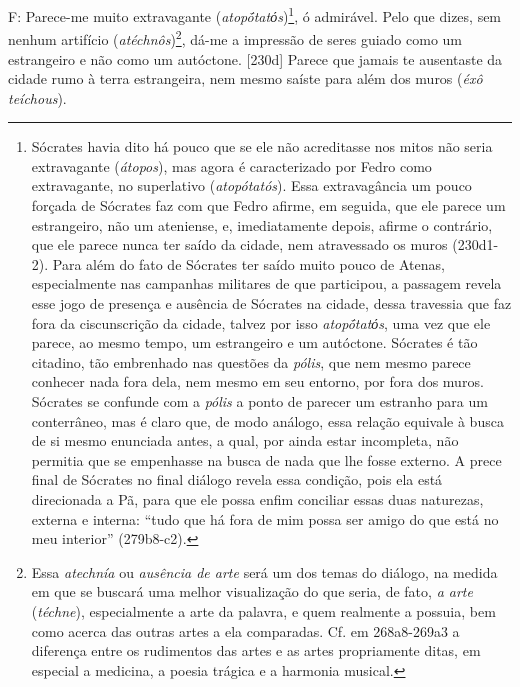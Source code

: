 F: Parece-me muito extravagante (\emph{atopṓtatόs})\footnote{Sócrates
  havia dito há pouco que se ele não acreditasse nos mitos não seria
  extravagante (\emph{átopos}), mas agora é caracterizado por Fedro como
  extravagante, no superlativo (\emph{atopótatós}). Essa extravagância
  um pouco forçada de Sócrates faz com que Fedro afirme, em seguida, que
  ele parece um estrangeiro, não um ateniense, e, imediatamente depois,
  afirme o contrário, que ele parece nunca ter saído da cidade, nem
  atravessado os muros (230d1-2). Para além do fato de Sócrates ter
  saído muito pouco de Atenas, especialmente nas campanhas militares de
  que participou, a passagem revela esse jogo de presença e ausência de
  Sócrates na cidade, dessa travessia que faz fora da ciscunscrição da
  cidade, talvez por isso \emph{atopṓtatόs}, uma vez que ele parece, ao
  mesmo tempo, um estrangeiro e um autóctone. Sócrates é tão citadino,
  tão embrenhado nas questões da \emph{pólis}, que nem mesmo parece
  conhecer nada fora dela, nem mesmo em seu entorno, por fora dos muros.
  Sócrates se confunde com a \emph{pólis} a ponto de parecer um estranho
  para um conterrâneo, mas é claro que, de modo análogo, essa relação
  equivale à busca de si mesmo enunciada antes, a qual, por ainda estar
  incompleta, não permitia que se empenhasse na busca de nada que lhe
  fosse externo. A prece final de Sócrates no final diálogo revela essa
  condição, pois ela está direcionada a Pã, para que ele possa enfim
  conciliar essas duas naturezas, externa e interna: ``tudo que há fora
  de mim possa ser amigo do que está no meu interior'' (279b8-c2).}, ó
admirável. Pelo que dizes, sem nenhum artifício
(\emph{atéchnôs})\footnote{Essa \emph{atechnía} ou \emph{ausência de
  arte} será um dos temas do diálogo, na medida em que se buscará uma
  melhor visualização do que seria, de fato, \emph{a arte}
  (\emph{téchne}), especialmente a arte da palavra, e quem realmente a
  possuia, bem como acerca das outras artes a ela comparadas. Cf. em
  268a8-269a3 a diferença entre os rudimentos das artes e as artes
  propriamente ditas, em especial a medicina, a poesia trágica e a
  harmonia musical.}, dá-me a impressão de seres guiado como um
estrangeiro e não como um autóctone. {[}230d{]} Parece que jamais te
ausentaste da cidade rumo à terra estrangeira, nem mesmo saíste para
além dos muros (\emph{éxô teíchous}).

